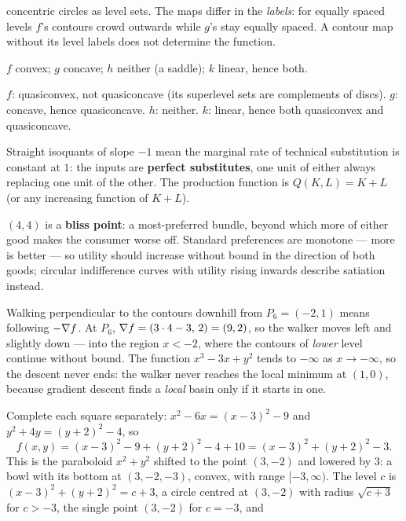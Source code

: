 \begin{solutions}
        concentric circles as level sets. The maps differ in the
        \emph{labels}: for equally spaced levels $f$'s contours crowd
        outwards while $g$'s stay equally spaced. A contour map without its
        level labels does not determine the function.
  \item $f$ convex; $g$ concave; $h$ neither (a saddle); $k$ linear, hence
        both.
  \item $f$: quasiconvex, not quasiconcave (its superlevel sets are
        complements of discs). $g$: concave, hence quasiconcave. $h$:
        neither. $k$: linear, hence both quasiconvex and quasiconcave.
  \item Straight isoquants of slope $-1$ mean the marginal rate of
        technical substitution is constant at $1$: the inputs are
        \textbf{perfect substitutes}, one unit of either always replacing
        one unit of the other. The production function is
        $Q(K,L)=K+L$ (or any increasing function of $K+L$).
  \item $(4,4)$ is a \textbf{bliss point}: a most-preferred bundle, beyond
        which more of either good makes the consumer worse off. Standard
        preferences are monotone --- more is better --- so utility should
        increase without bound in the direction of both goods; circular
        indifference curves with utility rising inwards describe satiation
        instead.
  \item Walking perpendicular to the contours downhill from $P_{6}=(-2,1)$
        means following $-\nabla f$. At $P_{6}$,
        $\nabla f=(3\cdot4-3,\,2)=(9,2)$, so the walker moves left and
        slightly down --- into the region $x<-2$, where the contours of
        \emph{lower} level continue without bound. The function
        $x^{3}-3x+y^{2}$ tends to $-\infty$ as $x\to-\infty$, so the
        descent never ends: the walker never reaches the local minimum at
        $(1,0)$, because gradient descent finds a \emph{local} basin only
        if it starts in one.
  \item Complete each square separately:
        $x^{2}-6x=(x-3)^{2}-9$ and $y^{2}+4y=(y+2)^{2}-4$, so
        \[
          f(x,y)=(x-3)^{2}-9+(y+2)^{2}-4+10=(x-3)^{2}+(y+2)^{2}-3 .
        \]
        This is the paraboloid $x^{2}+y^{2}$ shifted to the point $(3,-2)$
        and lowered by $3$: a bowl with its bottom at $(3,-2,-3)$, convex,
        with range $[-3,\infty)$. The level $c$ is
        $(x-3)^{2}+(y+2)^{2}=c+3$, a circle centred at $(3,-2)$ with radius
        $\sqrt{c+3}$ for $c>-3$, the single point $(3,-2)$ for $c=-3$, and

\end{solutions}
